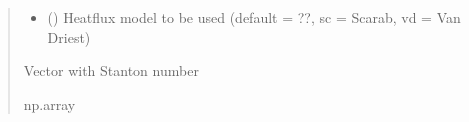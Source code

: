 \documentclass[letterpaper,10pt,english]{sphinxmanual}
\begin{document}
\begin{fulllineitems}
\begin{quote}
\begin{description}
\begin{itemize}
\item {} 
\sphinxAtStartPar
{} () \textendash{} Heatflux model to be used (default = ??, sc = Scarab, vd = Van Driest)

\end{itemize}

\sphinxAtStartPar
{} \textendash{} Vector with Stanton number

\sphinxAtStartPar
np.array

\end{description}\end{quote}

\end{fulllineitems}

\end{document}
